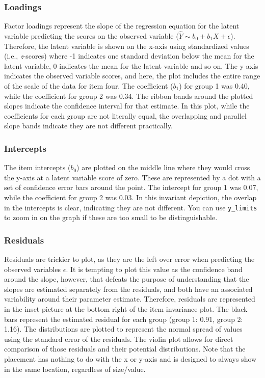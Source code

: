 \documentclass[
  man]{apa7}
\begin{document}
\hypertarget{loadings}{%
\subsubsection{Loadings}\label{loadings}}

Factor loadings represent the slope of the regression equation for the latent variable predicting the scores on the observed variable (\(\hat{Y} \sim b_0 + b_1X + \epsilon\)). Therefore, the latent variable is shown on the x-axis using standardized values (i.e., \emph{z}-scores) where -1 indicates one standard deviation below the mean for the latent variable, 0 indicates the mean for the latent variable and so on. The y-axis indicates the observed variable scores, and here, the plot includes the entire range of the scale of the data for item four. The coefficient (\(b_1\)) for group 1 was 0.40, while the coefficient for group 2 was 0.34. The ribbon bands around the plotted slopes indicate the confidence interval for that estimate. In this plot, while the coefficients for each group are not literally equal, the overlapping and parallel slope bands indicate they are not different practically.

\hypertarget{intercepts}{%
\subsubsection{Intercepts}\label{intercepts}}

The item intercepts (\(b_0\)) are plotted on the middle line where they would cross the y-axis at a latent variable score of zero. These are represented by a dot with a set of confidence error bars around the point. The intercept for group 1 was 0.07, while the coefficient for group 2 was 0.03. In this invariant depiction, the overlap in the intercepts is clear, indicating they are not different. You can use \texttt{y\_limits} to zoom in on the graph if these are too small to be distinguishable.

\hypertarget{residuals}{%
\subsubsection{Residuals}\label{residuals}}

Residuals are trickier to plot, as they are the left over error when predicting the observed variables \(\epsilon\). It is tempting to plot this value as the confidence band around the slope, however, that defeats the purpose of understanding that the slopes are estimated separately from the residuals, and both have an associated variability around their parameter estimate. Therefore, residuals are represented in the inset picture at the bottom right of the item invariance plot. The black bars represent the estimated residual for each group (group 1: 0.91, group 2: 1.16). The distributions are plotted to represent the normal spread of values using the standard error of the residuals. The violin plot allows for direct comparison of those residuals and their potential distributions. Note that the placement has nothing to do with the x or y-axis and is designed to always show in the same location, regardless of size/value.
\end{document}
